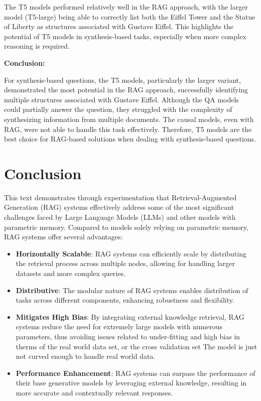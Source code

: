 \documentclass{wseas}
\begin{document}
The T5 models performed relatively well in the RAG approach, with the
larger model (T5-large) being able to correctly list both the Eiffel
Tower and the Statue of Liberty as structures associated with Gustave
Eiffel. This highlights the potential of T5 models in synthesis-based
tasks, especially when more complex reasoning is required.

\textbf{Conclusion:}

For synthesis-based questions, the T5 models, particularly the larger
variant, demonstrated the most potential in the RAG approach,
successfully identifying multiple structures associated with Gustave
Eiffel. Although the QA models could partially answer the question, they
struggled with the complexity of synthesizing information from multiple
documents. The causal models, even with RAG, were not able to handle
this task effectively. Therefore, T5 models are the best choice for
RAG-based solutions when dealing with synthesis-based questions.


\section{Conclusion}

This text demonstrates through experimentation that Retrieval-Augmented
Generation (RAG) systems effectively address some of the most
significant challenges faced by Large Language Models (LLMs) and other
models with parametric memory. Compared to models solely relying on
parametric memory, RAG systems offer several advantages:

\begin{itemize}

\item
  \textbf{Horizontally Scalable}: RAG systems can efficiently scale by
  distributing the retrieval process across multiple nodes, allowing for
  handling larger datasets and more complex queries.
\item
  \textbf{Distributive}: The modular nature of RAG systems enables
  distribution of tasks across different components, enhancing
  robustness and flexibility.
\item
  \textbf{Mitigates High Bias}: By integrating external knowledge
  retrieval, RAG systems reduce the need for extremely large models with
  numerous parameters, thus avoiding issues related to under-fitting and
  high bias in therms of the real world data set, or the cross
  validation set The model is just not curved enough to handle real
  world data.
\item
  \textbf{Performance Enhancement}: RAG systems can surpass the
  performance of their base generative models by leveraging external
  knowledge, resulting in more accurate and contextually relevant
  responses.
\end{itemize}
\end{document}
